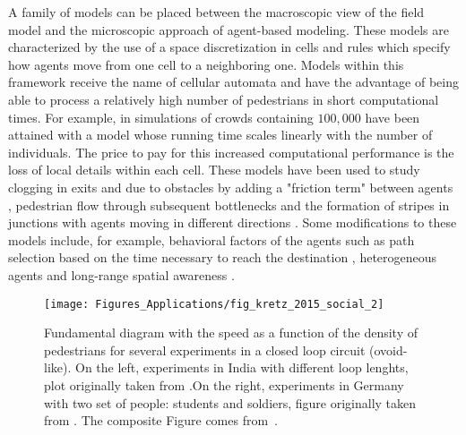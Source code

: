 A family of models can be placed between the macroscopic view of the field model and the microscopic approach of agent-based modeling. These models are characterized by the use of a space discretization in cells and rules which specify how agents move from one cell to a neighboring one. Models within this framework receive the name of cellular automata and have the advantage of being able to process a relatively high number of pedestrians in short computational times. For example, in \cite{dutta_2014_gpu} simulations of crowds containing $100,000$ have been attained with a model whose running time scales linearly with the number of individuals. The price to pay for this increased computational performance is the loss of local details within each cell. These models have been used to study clogging in exits and due to obstacles by adding a "friction term" between agents \cite{kirchner_2003_friction,yanagisawa_2009_introduction}, pedestrian flow through subsequent bottlenecks \cite{ezaki_2012_pedestrian} and the formation of stripes in junctions with agents moving in different directions \cite{cividini_2013_diagonal}.  Some modifications to these models include, for example, behavioral factors of the agents such as path selection based on the time necessary to reach the destination \cite{kirik_2009_shortest}, heterogeneous agents \cite{sarmady_2010_simulating} and long-range spatial awareness \cite{tissera_2014_simulating}.


\begin{figure}
\centering
\texttt{[image: Figures\_Applications/fig\_kretz\_2015\_social\_2]}
\caption{Fundamental diagram with the speed as a function of the density of pedestrians for several experiments in a closed loop circuit (ovoid-like). On the left, experiments in India with different loop lenghts, plot originally taken from \cite{chattaraj_2009_comparison}.On the right, experiments in Germany with two set of people: students and soldiers, figure originally taken from \cite{protz_2011_analyzing}. The composite Figure comes from~\cite{kretz_2015_social}. \label{fig:kretz_2015_social_2}}
\end{figure}



